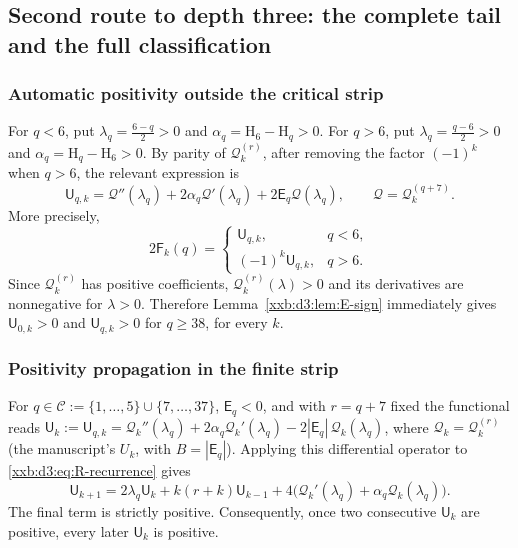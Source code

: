 \documentclass[11pt,a4paper]{article}
\numberwithin{equation}{section}
\theoremstyle{definition}
\theoremstyle{remark}
\theoremstyle{plain}
\begin{document}
\subsection{Second route to depth three: the complete tail and the full classification}\label{xxb:d3:sec:tail}

\subsubsection{Automatic positivity outside the critical strip}

For $q<6$, put $\lambda_q=\frac{6-q}{2}>0$ and $\alpha_q=\mathrm H_6-\mathrm H_q>0$.
For $q>6$, put $\lambda_q=\frac{q-6}{2}>0$ and $\alpha_q=\mathrm H_q-\mathrm H_6>0$.
By parity of $\mathcal Q_k^{(r)}$, after removing the factor $(-1)^k$ when
$q>6$, the relevant expression is
\begin{equation}
 \label{xxb:d3:eq:U-general}
 \mathsf U_{q,k}=\mathcal Q''(\lambda_q)+2\alpha_q\mathcal Q'(\lambda_q)
 +2\mathsf E_q\mathcal Q(\lambda_q),
 \qquad \mathcal Q=\mathcal Q_k^{(q+7)}.
\end{equation}
More precisely,
\begin{equation}
 \label{xxb:d3:eq:F-U}
 2\mathsf F_k(q)=
 \begin{cases}
 \mathsf U_{q,k},&q<6,\\
 (-1)^k\mathsf U_{q,k},&q>6.
 \end{cases}
\end{equation}
Since $\mathcal Q_k^{(r)}$ has positive coefficients,
$\mathcal Q_k^{(r)}(\lambda)>0$ and its derivatives are nonnegative for
$\lambda>0$.  Therefore Lemma~\ref{xxb:d3:lem:E-sign} immediately gives
$\mathsf U_{0,k}>0$ and $\mathsf U_{q,k}>0$ for $q\geq38$, for every $k$.

\subsubsection{Positivity propagation in the finite strip}

For $q\in\mathcal C:=\{1,\ldots,5\}\cup\{7,\ldots,37\}$, $\mathsf E_q<0$, and
with $r=q+7$ fixed the functional reads
$\mathsf U_k:=\mathsf U_{q,k}=\mathcal Q_k''(\lambda_q)+2\alpha_q\mathcal Q_k'(\lambda_q)
-2|\mathsf E_q|\,\mathcal Q_k(\lambda_q)$, where $\mathcal Q_k=\mathcal Q_k^{(r)}$
(the manuscript's $U_k$, with $B=|\mathsf E_q|$).  Applying this differential
operator to \eqref{xxb:d3:eq:R-recurrence} gives
\begin{equation}
 \label{xxb:d3:eq:U-recurrence}
 \mathsf U_{k+1}=2\lambda_q\mathsf U_k+k(r+k)\mathsf U_{k-1}
 +4\bigl(\mathcal Q_k'(\lambda_q)+\alpha_q\mathcal Q_k(\lambda_q)\bigr).
\end{equation}
The final term is strictly positive.  Consequently, once two consecutive
$\mathsf U_k$ are positive, every later $\mathsf U_k$ is positive.
\end{document}
